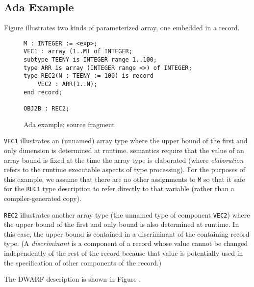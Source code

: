 \clearpage
\subsection{Ada Example}
\label{app:adaexample}
Figure 
illustrates two kinds of  
parameterized array, one embedded in a record.

\begin{figure}[here]
\begin{lstlisting}
M : INTEGER := <exp>;
VEC1 : array (1..M) of INTEGER;
subtype TEENY is INTEGER range 1..100;
type ARR is array (INTEGER range <>) of INTEGER;
type REC2(N : TEENY := 100) is record
    VEC2 : ARR(1..N);
end record;

OBJ2B : REC2;
\end{lstlisting}
\caption{Ada example: source fragment}
\label{fig:adaexamplesourcefragment}
\end{figure}

\texttt{VEC1} illustrates an (unnamed) array type where the upper bound
of the first and only dimension is determined at runtime. 
semantics require that the value of an array bound is fixed at
the time the array type is elaborated (where \textit{elaboration} refers
to the runtime executable aspects of type processing). For
the purposes of this example, we assume that there are no
other assignments to \texttt{M} so that it safe for the \texttt{REC1} type
description to refer directly to that variable (rather than
a compiler-generated copy).

\texttt{REC2} illustrates another array type (the unnamed type of
component \texttt{VEC2}) where the upper bound of the first and only
bound is also determined at runtime. In this case, the upper
bound is contained in a discriminant of the containing record
type. (A \textit{discriminant} is a component of a record whose value
cannot be changed independently of the rest of the record
because that value is potentially used in the specification
of other components of the record.)

The DWARF description is shown in 
Figure .


